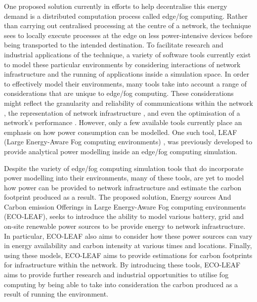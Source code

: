 \documentclass{l4proj}
\begin{document}
One proposed solution currently in efforts to help decentralise this energy demand is a distributed computation process called edge/fog computing.
Rather than carrying out centralised processing at the centre of a network, the technique sees to locally execute processes at the edge on less power-intensive devices before being transported to the intended destination.
To facilitate research and industrial applications of the technique, a variety of software tools currently exist to model these particular environments by considering interactions of network infrastructure and the running of applications inside a simulation space.
In order to effectively model their environments, many tools take into account a range of considerations that are unique to edge/fog computing.
These considerations might reflect the granularity and reliability of communications within the network \citep{FogNetSim}, the representation of network infrastructure \citep{ENIGMA}, and even the optimisation of a network's performance \citep{EdgeCloudSim}.
However, only a few available tools currently place an emphasis on how power consumption can be modelled.
One such tool, LEAF (Large Energy-Aware Fog computing environments) \citep{leaf2021}, was previously developed to provide analytical power modelling inside an edge/fog computing simulation.

Despite the variety of edge/fog computing simulation tools that do incorporate power modelling into their environments, many of these tools, are yet to model how power can be provided to network infrastructure and estimate the carbon footprint produced as a result.
The proposed solution, Energy sources And Carbon emission Offerings in Large Energy-Aware Fog computing environments (ECO-LEAF), seeks to introduce the ability to model various battery, grid and on-site renewable power sources to be provide energy to network infrastructure.
In particular, ECO-LEAF also aims to consider how these power sources can vary in energy availability and carbon intensity at various times and locations.
Finally, using these models, ECO-LEAF aims to provide estimations for carbon footprints for infrastructure within the network.
By introducing these tools, ECO-LEAF aims to provide further research and industrial opportunities to utilise fog computing by being able to take into consideration the carbon produced as a result of running the environment.

\end{document}
